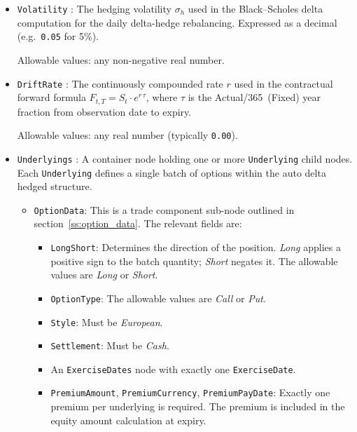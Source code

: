 \begin{itemize}

\item \lstinline!Volatility! :  The hedging volatility $\sigma_h$ used in the
  Black--Scholes delta computation for the daily delta-hedge rebalancing.
  Expressed as a decimal (e.g.\ \texttt{0.05} for 5\%).

  Allowable values: any non-negative real number.

\item \lstinline!DriftRate! :  The continuously compounded rate $r$ used in the
  contractual forward formula $F_{t,T} = S_t \cdot e^{r\,\tau}$, where $\tau$ is the
  Actual/365~(Fixed) year fraction from observation date to expiry.

  Allowable values: any real number (typically \texttt{0.00}).

\item \lstinline!Underlyings! :  A container node holding one or more
  \lstinline!Underlying! child nodes.  Each \lstinline!Underlying! defines a single batch
  of options within the auto delta hedged structure.

  \begin{itemize}

  \item \lstinline!OptionData!:  This is a trade component sub-node outlined in
    section~\ref{ss:option_data}.  The relevant fields are:

    \begin{itemize}
    \item \lstinline!LongShort!:  Determines the direction of the position.  \emph{Long}
      applies a positive sign to the batch quantity; \emph{Short} negates it.
      The allowable values are \emph{Long} or \emph{Short}.
    \item \lstinline!OptionType!:  The allowable values are \emph{Call} or \emph{Put}.
    \item \lstinline!Style!:  Must be \emph{European}.
    \item \lstinline!Settlement!:  Must be \emph{Cash}.
    \item An \lstinline!ExerciseDates! node with exactly one \lstinline!ExerciseDate!.
    \item \lstinline!PremiumAmount!, \lstinline!PremiumCurrency!, \lstinline!PremiumPayDate!:
      Exactly one premium per underlying is required.  The premium is included in the equity
      amount calculation at expiry.
    \end{itemize}


\end{itemize}
\end{itemize}
